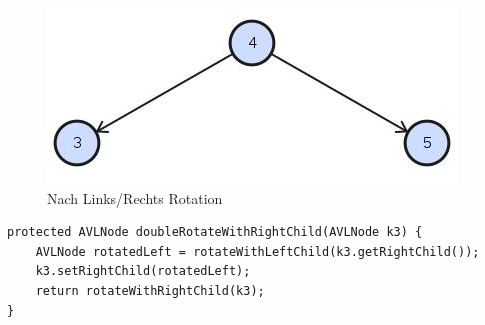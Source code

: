 \begin{figure}[h!]
\begin{minipage}[t]{0.4\textwidth}
		\label{fig:searchtreeinsert2}
	\end{minipage}
	\begin{minipage}[t]{0.4\textwidth}
		\centering
		\includegraphics[width=0.9\linewidth]{images/avl_rotation_final}
		\caption{Nach Links/Rechts Rotation}
		\label{fig:searchtreeinsert2}
	\end{minipage}
\end{figure}
\begin{lstlisting}[caption=AVL Tree: Left/Right Rotation]
protected AVLNode doubleRotateWithRightChild(AVLNode k3) {
	AVLNode rotatedLeft = rotateWithLeftChild(k3.getRightChild());
	k3.setRightChild(rotatedLeft);
	return rotateWithRightChild(k3);
}
\end{lstlisting}

\clearpage

